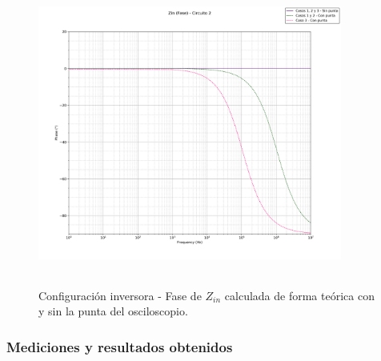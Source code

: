 \begin{figure}[H] %
	\centering
	\includegraphics[width=10cm,height=10cm,keepaspectratio]{../EJ1/00GRAFICOS/teoricos/circ2zinfase.png}
	\caption{Configuración inversora - Fase de $Z_{in}$ calculada de forma te\'orica con y sin la punta del osciloscopio.}
	\label{c2zintp}
\end{figure}

\subsubsection{Mediciones y resultados obtenidos} %



